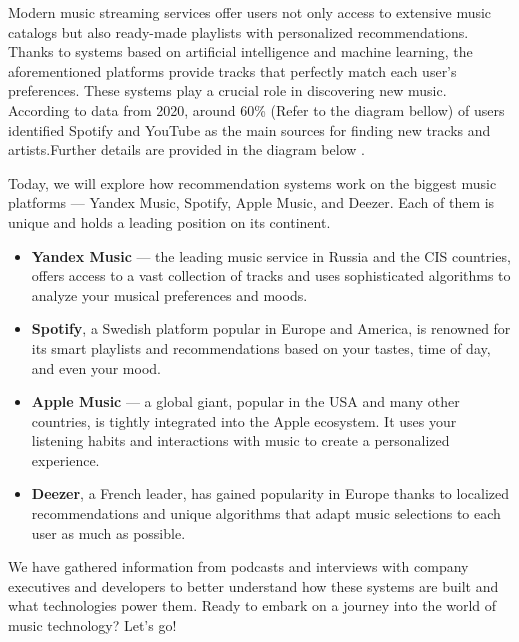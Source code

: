 \documentclass[12pt,a4paper]{article}
\begin{document}
Modern music streaming services offer users not only access to extensive music catalogs but also ready-made playlists with personalized recommendations. Thanks to systems based on artificial intelligence and machine learning, the aforementioned platforms provide tracks that perfectly match each user's preferences. These systems play a crucial role in discovering new music. According to data from 2020, around 60\% (Refer to the diagram bellow) of users identified Spotify and YouTube as the main sources for finding new tracks and artists.Further details are provided in the diagram below \citep{href}\citep{Woman}.

Today, we will explore how recommendation systems work on the biggest music platforms — Yandex Music, Spotify, Apple Music, and Deezer. Each of them is unique and holds a leading position on its continent.

\begin{itemize}
 \item \textbf{Yandex Music} — the leading music service in Russia and the CIS countries, offers access to a vast collection of tracks and uses sophisticated algorithms to analyze your musical preferences and moods.

\item \textbf{Spotify}, a Swedish platform popular in Europe and America, is renowned for its smart playlists and recommendations based on your tastes, time of day, and even your mood.

\item \textbf{Apple Music} — a global giant, popular in the USA and many other countries, is tightly integrated into the Apple ecosystem. It uses your listening habits and interactions with music to create a personalized experience.

\item \textbf{Deezer}, a French leader, has gained popularity in Europe thanks to localized recommendations and unique algorithms that adapt music selections to each user as much as possible.
\end{itemize}

\citep{Diagramm}

We have gathered information from podcasts and interviews with company executives and developers to better understand how these systems are built and what technologies power them. Ready to embark on a journey into the world of music technology? Let's go!
\end{document}

